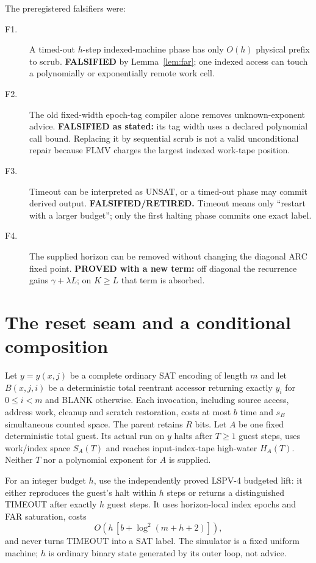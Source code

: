 \documentclass[11pt]{article}
\begin{document}
The preregistered falsifiers were:
\begin{description}
\item[F1.] A timed-out $h$-step indexed-machine phase has only $O(h)$ physical
prefix to scrub.  \textbf{FALSIFIED} by Lemma~\ref{lem:far}; one indexed access
can touch a polynomially or exponentially remote work cell.
\item[F2.] The old fixed-width epoch-tag compiler alone removes unknown-exponent
advice.  \textbf{FALSIFIED as stated:} its tag width uses a declared polynomial
call bound.  Replacing it by sequential scrub is not a valid unconditional
repair because FLMV charges the largest indexed work-tape position.
\item[F3.] Timeout can be interpreted as UNSAT, or a timed-out phase may commit
derived output.  \textbf{FALSIFIED/RETIRED.} Timeout means only ``restart with a
larger budget''; only the first halting phase commits one exact label.
\item[F4.] The supplied horizon can be removed without changing the diagonal ARC
fixed point.  \textbf{PROVED with a new term:} off diagonal the recurrence gains
$\gamma+\lambda L$; on $K\ge L$ that term is absorbed.
\end{description}

\section{The reset seam and a conditional composition}
Let $y=y(x,j)$ be a complete ordinary SAT encoding of length $m$ and let
$B(x,j,i)$ be a deterministic total reentrant accessor returning exactly $y_i$
for $0\le i<m$ and BLANK otherwise.  Each invocation, including source access,
address work, cleanup and scratch restoration, costs at most $b$ time and $s_B$
simultaneous counted space.  The parent retains $R$ bits.  Let $A$ be one fixed
deterministic total guest.  Its actual run on $y$ halts after $T\ge1$ guest
steps, uses work/index space $S_A(T)$ and reaches input-index-tape high-water
$H_A(T)$.  Neither $T$ nor a polynomial exponent for $A$ is supplied.

For an integer budget $h$, use the independently proved LSPV-4 budgeted lift:
it either reproduces the guest's halt within $h$ steps or returns a distinguished
TIMEOUT after exactly $h$ guest steps.  It uses horizon-local index epochs and
FAR saturation, costs
\[
 O\!\left(h\,[b+\log^2(m+h+2)]\right),
\]
and never turns TIMEOUT into a SAT label.  The simulator is a fixed uniform
machine; $h$ is ordinary binary state generated by its outer loop, not advice.
\end{document}
